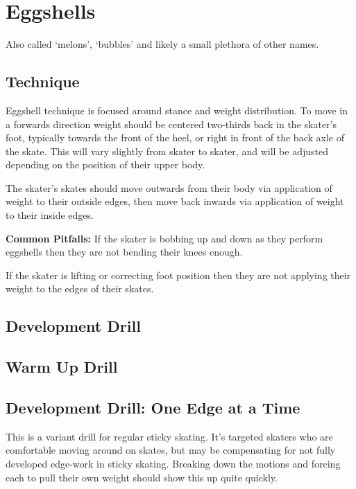 \section{Eggshells}
\label{sec:sticky/eggshells}

Also called `melons', `bubbles' and likely a small plethora of other names. 


\subsection*{Technique}

Eggshell technique is focused around stance and weight distribution.
To move in a forwards direction weight should be centered two-thirds back in the skater's foot, typically towards the front of the heel, or right in front of the back axle of the skate.  
This will vary slightly from skater to skater, and will be adjusted depending on the position of their upper body. 

The skater's skates should move outwards from their body via application of weight to their outside edges, then move back inwards via application of weight to their inside edges.


{\bf Common Pitfalls: }
If the skater is bobbing up and down as they perform eggshells then they are not bending their knees enough. 


If the skater is lifting or correcting foot position then they are not applying their weight to the edges of their skates.  

\subsection*{Development Drill}

\subsection*{Warm Up Drill}

\subsection*{Development Drill: One Edge at a Time}
\label{drill:sticky/eggshells/one_edge}

This is a variant drill for regular sticky skating. 
It's targeted skaters who are comfortable moving around on skates, but may be compensating for not fully developed edge-work in sticky skating.
Breaking down the motions and forcing each to pull their own weight should show this up quite quickly.

